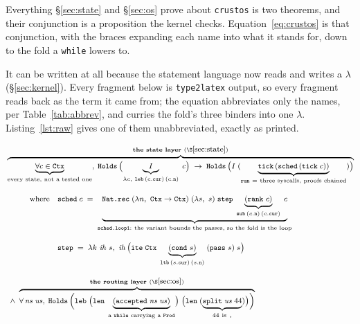 \documentclass[11pt]{article}
\newcommand{\code}[1]{\texttt{#1}}
\begin{document}
Everything \S\ref{sec:state} and \S\ref{sec:os} prove about \code{crustos} is
two theorems, and their conjunction is a proposition the kernel checks.
Equation~\eqref{eq:crustos} is that conjunction, with the braces expanding
each name into what it stands for, down to the fold a \code{while} lowers to.

It can be written at all because the statement language now reads and writes a
$\lambda$ (\S\ref{sec:kernel}). Every fragment below is \code{type2latex}
output, so every fragment reads back as the term it came from; the equation
abbreviates only the names, per Table~\ref{tab:abbrev}, and curries the fold's
three binders into one $\lambda$. Listing~\ref{lst:raw} gives one of them
unabbreviated, exactly as printed.

\newcommand{\ctx}{\code{Ctx}}
\newcommand{\cur}[1]{#1.\code{cur}}
\newcommand{\nth}[1]{#1.\code{n}}
\newcommand{\hld}{\code{Holds}}

\begin{equation}
\label{eq:crustos}
\footnotesize
\begin{aligned}
&\overbrace{
  \underbrace{\forall c \in \ctx}_{\text{every state, not a tested one}},\;
  \hld\,\bigl(\underbrace{I}_{\lambda c,\ \code{leb}\,(\cur{c})\,(\nth{c})}\; c\bigr)
  \;\to\;
  \hld\,\bigl(I\;(\underbrace{\code{tick}\,(\code{sched}\,(\code{tick}\;c))}_{\code{run}\ =\ \text{three syscalls, proofs chained}})\bigr)
}^{\textbf{the state layer}\ (\S\ref{sec:state})}
\\[2.2ex]
&\hspace{3em}\text{where}\quad
\code{sched}\;c \;=\;
\underbrace{
  \code{Nat.rec}\;(\lambda n,\ \ctx \to \ctx)\;(\lambda s,\ s)\;\code{step}\;
  \underbrace{(\code{rank}\ c)}_{\code{sub}\,(\nth{c})\,(\cur{c})}\;c
}_{\code{sched.loop1}:\ \text{the variant bounds the passes, so the fold is the loop}}
\\[2.2ex]
&\hspace{3em}\phantom{\text{where}}\quad
\code{step} \;=\;
\lambda k\ \mathit{ih}\ s,\ \mathit{ih}\,\bigl(\code{ite}\;\ctx\;
    \underbrace{(\code{cond}\ s)}_{\code{ltb}\,(\cur{s})\,(\nth{s})}\;
    (\code{pass}\ s)\;s\bigr)
\\[2.2ex]
&\;\wedge\;
\overbrace{
  \forall\,\mathit{ns}\;\mathit{us},\;
  \hld\,\Bigl(\code{leb}\;
    \bigl(\code{len}\;\underbrace{(\code{accepted}\;\mathit{ns}\;\mathit{us})}_{\text{a \code{while} carrying a } \code{Prod}}\bigr)\;
    \bigl(\code{len}\;(\underbrace{\code{split}\;\mathit{us}\;44}_{44\ \text{is}\ \code{,}})\bigr)\Bigr)
}^{\textbf{the routing layer}\ (\S\ref{sec:os})}
\end{aligned}
\end{equation}
\end{document}
